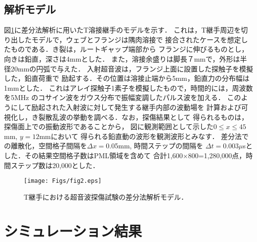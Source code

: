 \documentclass{jsce}
\begin{document}
\subsection{解析モデル}
図\ref{fig:fig2}に差分法解析に用いたT溶接継手のモデルを示す．
これは，T継手周辺を切り出したモデルで，ウェブとフランジは隅肉溶接で
接合されたケースを想定したものである．き裂は，ルートギャップ端部から
フランジに伸びるものとし，向きは鉛直，深さは4mmとした．
また，溶接余盛りは脚長７mmで，外形は半径20mmの円弧で与えた．
入射超音波は，フランジ上面に設置した探触子を模擬した，鉛直荷重で
励起する．その位置は溶接止端から5mm，鉛直力の分布幅は1mmとした．
これはアレイ探触子1素子を模擬したもので，時間的には，周波数を5MHz
のコサイン波をガウス分布で振幅変調したパルス波を加える．
このようにして励起された入射波に対して発生する継手内部の波動場を
計算および可視化し，き裂散乱波の挙動を調べる．なお，探傷結果として
得られるものは，探傷面上での振動波形であることから，
図に観測範囲として示した$0\leq x\leq 45$mm, $y=12$mmにおいて
得られる鉛直動の波形を観測波形とみなす．
差分法での離散化，空間格子間隔を$\Delta x=$0.05mm, 時間ステップの間隔を
$\Delta t=$0.003$\mu$sとした．その結果空間格子数はPML領域を含めて
合計1,600$\times$800=1,280,000点，時間ステップ数は20,000とした．
\begin{figure}[h]
	\begin{center}
	\texttt{[image: Figs/fig2.eps]} 
	\end{center}
	\caption{
		T継手における超音波探傷試験の差分法解析モデル．
	} 
	\label{fig:fig2}
\end{figure}
\section{シミュレーション結果}
\end{document}
